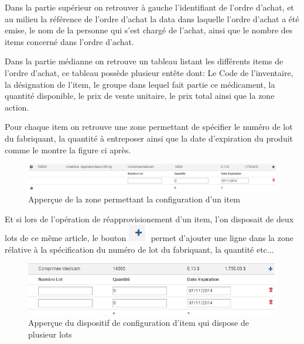 \documentclass[12pt,a4paper]{report}
\begin{document}
\newpage

Dans la partie supérieur on retrouver à gauche l'identifiant de l'ordre d'achat, et au milieu la référence de l'ordre d'achat la data dans laquelle l'ordre d'achat a été emise, le nom de la personne qui s'est chargé de l'achat, ainsi que le nombre des items concerné dans l'ordre d'achat.

Dans la partie médianne on retrouve un tableau listant les différents items de l'ordre d'achat, ce tableau possède plusieur entête dont: Le Code de l'inventaire, la désignation de l'item, le groupe dans lequel fait partie ce médicament, la quantité disponible, le prix de vente unitaire, le prix total ainsi que la zone action.

Pour chaque item on retrouve une zone permettant de spécifier le numéro de lot du fabriquant, la quantité à entreposer ainsi que la date d'expiration du produit comme le montre la figure ci après.

\begin{figure}[h]
\begin{center}
\includegraphics[width=12cm]{pic/illustrationStock.png}
\end{center}
\caption{Apperçue de la zone permettant la configuration d'un item}
\label{Apperçue de la zone permettant la configuration d'un item}
\end{figure}

Et si lors de l'opération de réapprovisionement d'un item, l'on disposait de deux lots de ce même article, le bouton \includegraphics[scale=0.7]{pic/PlusGray.png} permet d'ajouter une ligne dans la zone rélative à la spécification du numéro de lot du fabriquant, la quantité etc...

\begin{figure}[h]
\begin{center}
\includegraphics[width=12cm]{pic/ForAddPlus.png}
\end{center}
\caption{Apperçue du dispositif de configuration d'item qui dispose de plusieur lots}
\label{Apperçue du dispositif de configuration d'item qui dispose de plusieur lots}
\end{figure}
\end{document}
